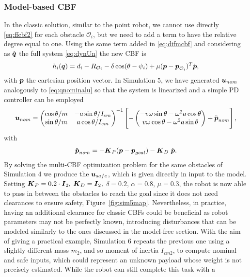 \subsubsection{Model-based CBF}
In the classic solution, similar to the point robot, we cannot use directly \eqref{eq:ffcbf2} for each obstacle $\mathcal{O}_i$, but we need to add a term to have the relative degree equal to one. Using the same term added in \eqref{eq:difmcbf} and considering as $\dot{\boldsymbol{q}}$ the full system \eqref{eq:dynUn} the new CBF is
\begin{equation}
   h_i({\boldsymbol{q}}) = d_i-R_{\mathcal{O}_i}-\delta \cos(\theta - \psi_i)+\mu(\boldsymbol{p}-\boldsymbol{p}_{\mathcal{O}_i})^T\dot{\boldsymbol{p}},
   \label{eq:ffcbf2}
\end{equation}
with $\boldsymbol{p}$ the cartesian position vector. In Simulation 5, we have generated $\boldsymbol{u}_{nom}$ analogously to \eqref{eq:qnominalu} so that the system is linearized and a simple PD controller can be employed
    \begin{equation}
          \boldsymbol{u}_{nom}= \begin{pmatrix}
      \cos\theta/m & -a\sin\theta/I_{cm} \\
       \sin\theta/m & a\cos\theta/I_{cm}
    \end{pmatrix}^{-1} 
     \begin{bmatrix}
     - \begin{pmatrix}
     -v\omega\sin\theta-\omega^2a\cos\theta \\
        v\omega\cos\theta-\omega^2a\sin\theta
         \end{pmatrix}
           + \ddot{\boldsymbol{p}}_{nom}
         \end{bmatrix},
    \end{equation}
with  
\begin{equation}
   \ddot{\boldsymbol{p}}_{nom} = -\boldsymbol{K}_P(\boldsymbol{p}-\boldsymbol{p}_{goal})-\boldsymbol{K}_D~\dot{\boldsymbol{p}}.
\end{equation}
By solving the multi-CBF optimization problem for the same obstacles of Simulation 4 we produce the $\boldsymbol{u}_{safe}$, which is given directly in input to the model. 
Setting $\boldsymbol{K}_P = 0.2\cdot\boldsymbol{I}_2,$ $\boldsymbol{K}_D = \boldsymbol{I}_2,$ $\delta = 0.2$, $\alpha = 0.8$, $\mu = 0.3$, the robot is now able to pass in between the obstacles to reach the goal since it does not need clearances to ensure safety, Figure~\ref{fig:sim5map}. 
Nevertheless, in practice, having an additional clearance for classic CBFs could be beneficial as robot parameters may not be perfectly known, introducing disturbances that can be modeled similarly to the ones discussed in the model-free section. With the aim of giving a practical example, Simulation 6 repeats the previous one using a slightly different mass $m_2$, and so moment of inertia $I_{cm2}$, to compute nominal and safe inputs, which could represent an unknown payload whose weight is not precisely estimated. While the robot can still complete this task with a
